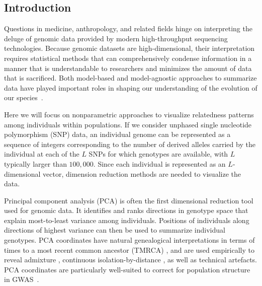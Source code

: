 \documentclass[12pt]{pnas-new}
\begin{document}
\subsection*{Introduction}

Questions in medicine, anthropology, and related fields hinge on interpreting the deluge of genomic data provided by modern high-throughput sequencing technologies. Because genomic datasets are high-dimensional, their interpretation requires statistical methods that can comprehensively condense information in a manner that is understandable to researchers and minimizes the amount of data that is sacrificed. Both model-based and model-agnostic approaches to summarize data have played important roles in shaping our understanding of the evolution of our species~\cite{lawson2012inference}.

Here we will focus on nonparametric approaches to visualize relatedness patterns among individuals within populations. If we consider unphased single nucleotide polymorphism (SNP) data, an individual genome can be represented as a sequence of integers corresponding to the number of derived alleles carried by the individual at each of the $L$ SNPs for which genotypes are available, with $L$ typically larger than $100,000$. Since each individual is represented as an $L$-dimensional vector, dimension reduction methods are needed to visualize the data.

Principal component analysis (PCA) is often the first dimensional reduction tool used for genomic data. It identifies and ranks directions in genotype space that explain most-to-least variance among individuals. Positions of individuals along directions of highest variance can then be used to summarize individual genotypes. PCA coordinates have natural genealogical interpretations in terms of times to a most recent common ancestor (TMRCA) \cite{mcvean2009genealogical}, and are used empirically to reveal admixture \cite{brisbin2012pcadmix}, continuous isolation-by-distance \cite{novembre2008europe, nelson2008population}, as well as technical artefacts. PCA coordinates are particularly well-suited to correct for population structure in GWAS~\cite{eigen2006}.
\end{document}
